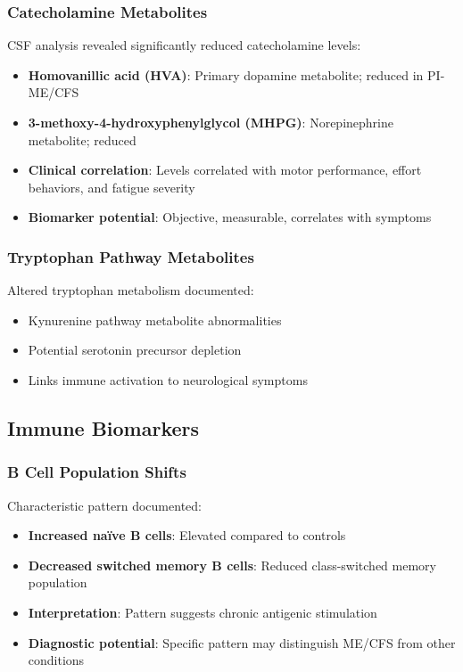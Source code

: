 \subsubsection{Catecholamine Metabolites}
CSF analysis revealed significantly reduced catecholamine levels:
\begin{itemize}
    \item \textbf{Homovanillic acid (HVA)}: Primary dopamine metabolite; reduced in PI-ME/CFS
    \item \textbf{3-methoxy-4-hydroxyphenylglycol (MHPG)}: Norepinephrine metabolite; reduced
    \item \textbf{Clinical correlation}: Levels correlated with motor performance, effort behaviors, and fatigue severity
    \item \textbf{Biomarker potential}: Objective, measurable, correlates with symptoms
\end{itemize}

\subsubsection{Tryptophan Pathway Metabolites}
Altered tryptophan metabolism documented:
\begin{itemize}
    \item Kynurenine pathway metabolite abnormalities
    \item Potential serotonin precursor depletion
    \item Links immune activation to neurological symptoms
\end{itemize}

\subsection{Immune Biomarkers}

\subsubsection{B Cell Population Shifts}
Characteristic pattern documented:
\begin{itemize}
    \item \textbf{Increased naïve B cells}: Elevated compared to controls
    \item \textbf{Decreased switched memory B cells}: Reduced class-switched memory population
    \item \textbf{Interpretation}: Pattern suggests chronic antigenic stimulation
    \item \textbf{Diagnostic potential}: Specific pattern may distinguish ME/CFS from other conditions
\end{itemize}

